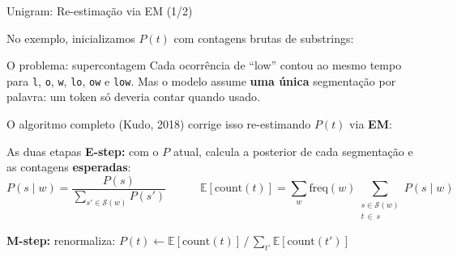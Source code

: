 \documentclass[aspectratio=169,xcolor=dvipsnames]{beamer}
\begin{document}
\begin{frame}{Unigram: Re-estimação via EM (1/2)}

No exemplo, inicializamos $P(t)$ com contagens brutas de substrings:

\begin{alertblock}{O problema: supercontagem}
Cada ocorrência de ``low'' contou ao mesmo tempo para \texttt{l}, \texttt{o}, \texttt{w}, \texttt{lo}, \texttt{ow} e \texttt{low}. Mas o modelo assume \textbf{uma única} segmentação por palavra: um token só deveria contar quando usado.
\end{alertblock}

O algoritmo completo (Kudo, 2018) corrige isso re-estimando $P(t)$ via \textbf{EM}:

\begin{block}{As duas etapas}
\small
\textbf{E-step:} com o $P$ atual, calcula a posterior de cada segmentação e as contagens \textbf{esperadas}:
\vspace{-6pt}
\[
P(s \mid w) = \frac{P(s)}{\sum_{s' \in \mathcal{S}(w)} P(s')}
\qquad\quad
\mathbb{E}[\text{count}(t)] = \sum_{w} \text{freq}(w) \!\!\sum_{\substack{s \in \mathcal{S}(w) \\ t \,\in\, s}}\!\! P(s \mid w)
\]

\vspace{-2pt}
\textbf{M-step:} renormaliza: $P(t) \leftarrow \mathbb{E}[\text{count}(t)] \,/\, \sum_{t'} \mathbb{E}[\text{count}(t')]$
\end{block}

\end{frame}

\end{document}
